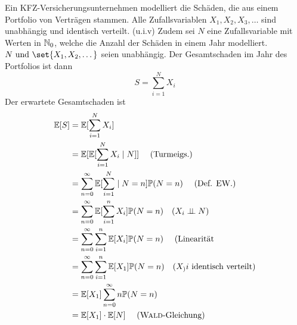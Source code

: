 \begin{example}
	Ein KFZ-Versicherungsunternehmen modelliert die Schäden, die aus einem Portfolio von Verträgen stammen. Alle Zufallsvariablen $X_1,X_2,X_3,\dots$ sind unabhängig und identisch verteilt. (u.i.v) Zudem sei $N$ eine Zufallsvariable mit Werten in $\mathbb{N}_0$, welche die Anzahl der Schäden in einem Jahr modelliert. $N \und \set{X_1, X_2, \dots}$ seien unabhängig. Der Gesamtschaden im Jahr des Portfolios ist dann
	\[
		S = \sum_{i=1}^N X_i
	\]
	Der erwartete Gesamtschaden ist
	\begin{align*} %
		\E[S] &= \E[\sum_{i=1}^N X_i]\\
		&=\E[\E[\sum_{i=1}^N X_i \mid N]] \quad \text{ (Turmeigs.)}\\
		&= \sum_{n=0}^{\infty} \E[\sum_{i=1}^N \mid N = n]\P(N=n) \quad\text{ (Def. EW.)}\\
		&= \sum_{n=0}^{\infty} \E[\sum_{i=1}^n X_i]\P(N=n) \quad \text{(}X_i \upmodels N\text{)}\\
		&= \sum_{n=0}^{\infty}\sum_{i=1}^n \E[X_i]\P(N=n) \quad \text{ (Linearität}\\
		&= \sum_{n=0}^{\infty}\sum_{i=1}^n \E[X_1]\P(N=n) \quad \text{($X_)i$ identisch verteilt)}\\
		&= \E[X_1] \sum_{n=0}^{\infty} n \P(N=n)\\
		&= \E[X_1]\cdot \E[N] \quad \text{ (\person{Wald}-Gleichung)}
	\end{align*}
\end{example}
